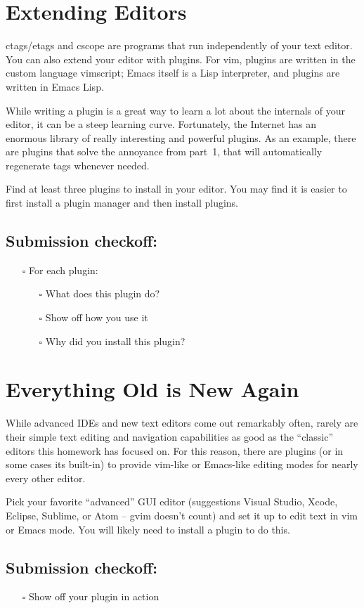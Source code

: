 \documentclass{article}
\begin{document}
\section{Extending Editors}

ctags/etags and cscope are programs that run independently of your text
editor. You can also extend your editor with plugins. For vim, plugins are
written in the custom language vimscript; Emacs itself is a Lisp interpreter,
and plugins are written in Emacs Lisp.

While writing a plugin is a great way to learn a lot about the internals of
your editor, it can be a steep learning curve. Fortunately, the Internet has
an enormous library of really interesting and powerful plugins.
As an example, there are plugins that solve the annoyance from part~1, that
will automatically regenerate tags whenever needed.

Find at least three plugins to install in your editor. You may find it is
easier to first install a plugin manager and then install plugins.

\subsection*{Submission checkoff:}
\begin{itemize}
  \item[$\square$] For each plugin:
    \begin{itemize}
      \item[$\square$] What does this plugin do?
      \item[$\square$] Show off how you use it
      \item[$\square$] Why did you install this plugin?
    \end{itemize}
\end{itemize}


\section{Everything Old is New Again}

While advanced IDEs and new text editors come out remarkably often, rarely are
their simple text editing and navigation capabilities as good as the
``classic'' editors this homework has focused on. For this reason, there are
plugins (or in some cases its built-in) to provide vim-like or Emacs-like
editing modes for nearly every other editor.

Pick your favorite ``advanced'' GUI editor (suggestions Visual Studio, Xcode,
Eclipse, Sublime, or Atom -- gvim doesn't count) and set it up to edit text in
vim or Emacs mode. You will likely need to install a plugin to do this.

\subsection*{Submission checkoff:}
\begin{itemize}
  \item[$\square$] Show off your plugin in action
\end{itemize}
\end{document}
